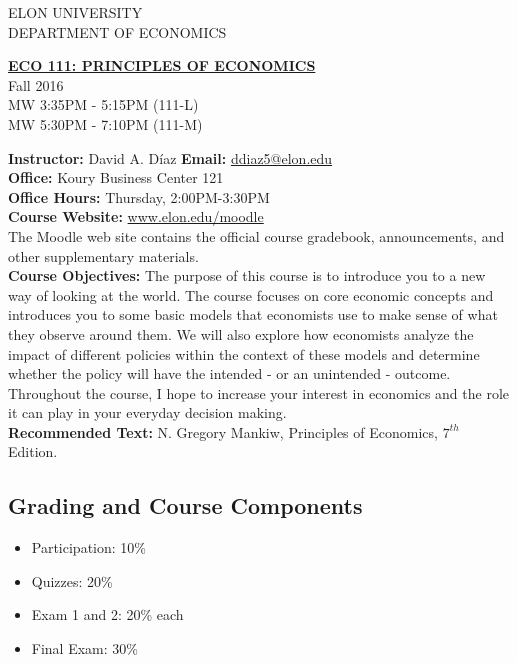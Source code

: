 \documentclass[11pt]{article}
\begin{document}
\begin{center} ELON UNIVERSITY\\
DEPARTMENT OF ECONOMICS \\
\end{center}

\begin{center}\textbf{{\hspace{-.05in}}
\underline{ECO 111: PRINCIPLES OF ECONOMICS}}
\\ Fall 2016
\\ MW 3:35PM - 5:15PM (111-L)
\\ MW 5:30PM - 7:10PM (111-M)
\end{center}


\textbf{Instructor:} David A. D\'iaz \hspace{4.5cm} \textbf{Email:} \url{ddiaz5@elon.edu}\\
\textbf{Office:}  Koury Business Center 121   \\
\textbf{Office Hours:} Thursday, 2:00PM-3:30PM\\
\textbf{Course Website:} \url{www.elon.edu/moodle} \\
The Moodle web site contains the official course gradebook, announcements, and other supplementary materials.\\

\textbf{Course Objectives:} The purpose of this course is to introduce you to a new way of looking at the world. The course focuses on core economic concepts and introduces you to some basic models that economists use to make sense of what they observe around them. We will also explore how economists analyze the impact of different policies within the context of these models and determine whether the policy will have the intended - or an unintended - outcome. Throughout the course, I hope to increase your interest in economics and the role it can play in your everyday decision making.
\\

\textbf{Recommended Text:} N. Gregory Mankiw, Principles of Economics, $7^{th}$ Edition.


\subsection*{Grading and Course Components}
\begin{itemize}
	\item Participation: 10\%
	\item Quizzes: 20\%
	\item Exam 1 and 2: 20\% each
	\item	Final Exam: 30\% 
\end{itemize}
\end{document}
